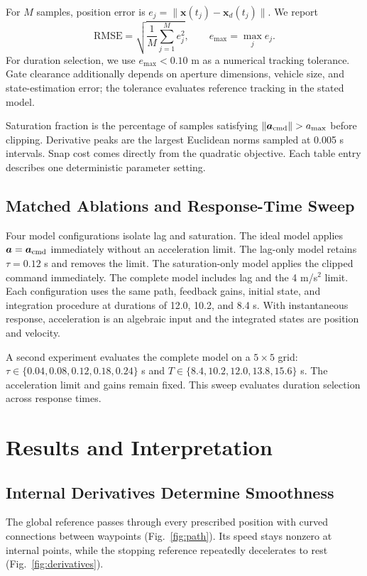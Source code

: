 \documentclass[letterpaper,10pt,conference]{ieeeconf}
\newcommand{\norm}[1]{\lVert#1\rVert}
\begin{document}
For $M$ samples, position error is $e_j=\norm{\bm x(t_j)-\bm x_d(t_j)}$.
We report
\begin{equation}
\mathrm{RMSE}=\sqrt{\frac1M\sum_{j=1}^{M}e_j^2},\qquad
e_{\max}=\max_j e_j.
\end{equation}
For duration selection, we use $e_{\max}<0.10$ m as a numerical tracking tolerance.
Gate clearance additionally depends on aperture dimensions, vehicle size, and state-estimation error; the tolerance evaluates reference tracking in the stated model.

Saturation fraction is the percentage of samples satisfying $\norm{\bm a_{\rm cmd}}>a_{\max}$ before clipping.
Derivative peaks are the largest Euclidean norms sampled at 0.005 s intervals.
Snap cost comes directly from the quadratic objective.
Each table entry describes one deterministic parameter setting.
\subsection{Matched Ablations and Response-Time Sweep}
Four model configurations isolate lag and saturation.
The ideal model applies $\bm a=\bm a_{\rm cmd}$ immediately without an acceleration limit.
The lag-only model retains $\tau=0.12$ s and removes the limit.
The saturation-only model applies the clipped command immediately.
The complete model includes lag and the 4 m/s$^2$ limit.
Each configuration uses the same path, feedback gains, initial state, and integration procedure at durations of 12.0, 10.2, and 8.4 s.
With instantaneous response, acceleration is an algebraic input and the integrated states are position and velocity.

A second experiment evaluates the complete model on a $5\times5$ grid: $\tau\in\{0.04,0.08,0.12,0.18,0.24\}$ s and $T\in\{8.4,10.2,12.0,13.8,15.6\}$ s.
The acceleration limit and gains remain fixed.
This sweep evaluates duration selection across response times.
\section{Results and Interpretation}
\subsection{Internal Derivatives Determine Smoothness}
The global reference passes through every prescribed position with curved connections between waypoints (Fig.~\ref{fig:path}).
Its speed stays nonzero at internal points, while the stopping reference repeatedly decelerates to rest (Fig.~\ref{fig:derivatives}).
\end{document}
